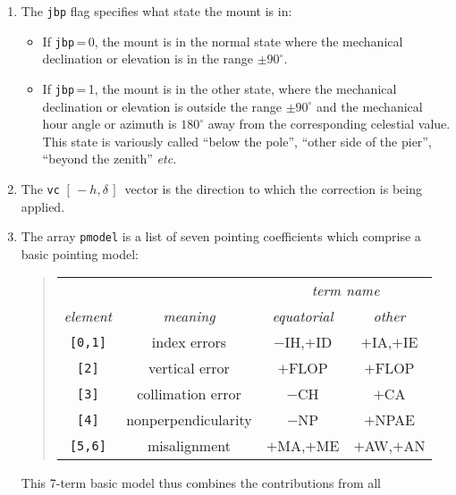 \documentclass[12pt,fleqn,twoside]{article}
\renewcommand{\_}{{\tt\char'137}}     %
\newcommand{\mhadec}     {$[\,-h,\delta\,]$}
\begin{document}
{\begin{enumerate}
\begin{itemize}
            basic model is IA, IE, FLOP, TF, CA, NPAE, AW, AN.
      \item If {\tt mount}\,=\,3, the mount is a generalized gimbal
            and the basic model is
            IA, IE, FLOP, TF, CA, NPAE, AW, AN.  In this case, all
            the terms except FLOP are in the mount's nominal frame,
            as given by the matrix {\tt ae2nm}.
      \end{itemize}
\item The {\tt jbp} flag specifies what state the mount is in:
      \begin{itemize}
      \item If {\tt jbp}\,=\,0, the mount is in the normal state
            where the mechanical declination or elevation is in the
            range $\pm90^\circ$.
      \item If {\tt jbp}\,=\,1, the mount is in the other state,
            where the mechanical
            declination or elevation is outside the range $\pm90^\circ$
            and the mechanical hour angle or azimuth is $180^\circ$
            away from the corresponding celestial value.  This state is
            variously called ``below the pole'', ``other side of the pier'',
            ``beyond the zenith'' {\it etc.}
      \end{itemize}
\item The {\tt vc} \mhadec\ vector is the direction to which the
      correction is being applied.
\item The array {\tt pmodel} is a list of seven pointing coefficients
      which comprise a basic pointing model:
      \begin{quote}
      \begin{tabular}{cccc}
      & & \multicolumn{2}{c}{\it term name} \\
      {\it element} & {\it meaning} & {\it equatorial} & {\it other} \\[1ex]
      {\tt [0,1]} & index errors & $-$IH,$+$ID & $+$IA,$+$IE \\
      {\tt [2]} & vertical error & $+$FLOP & $+$FLOP \\
      {\tt [3]} & collimation error & $-$CH & $+$CA \\
      {\tt [4]} & nonperpendicularity & $-$NP & $+$NPAE \\
      {\tt [5,6]} & misalignment & $+$MA,$+$ME & $+$AW,$+$AN \\
      \end{tabular}
      \end{quote}
      This 7-term basic model thus combines the contributions from all

\end{enumerate}}
\end{document}
